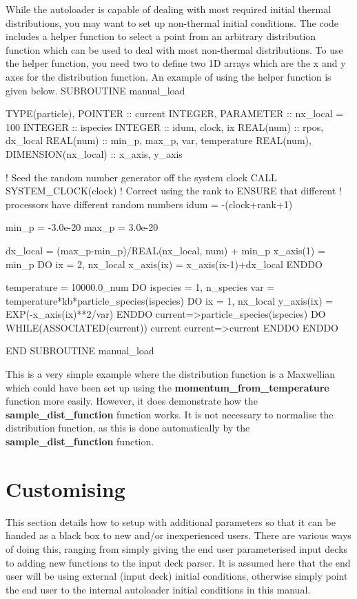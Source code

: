 \documentclass[12pt,a4paper]{article}
\newcommand{\EPOCH}{{\color{warwickdark}\fontfamily{phv}\selectfont{EPOCH}}}
\newenvironment{boxverbatim}{\lboxverbatim{none}}{\endlboxverbatim}
\begin{document}
While the autoloader is capable of dealing with most required initial thermal
distributions, you may want to set up non-thermal initial conditions. The code
includes a helper function to select a point from an arbitrary distribution
function which can be used to deal with most non-thermal distributions. To use
the helper function, you need two to define two 1D arrays which are the x and
y axes for the distribution function. An example of using the helper function
is given below.
\begin{boxverbatim}
SUBROUTINE manual_load

  TYPE(particle), POINTER :: current
  INTEGER, PARAMETER :: nx_local = 100
  INTEGER :: ispecies
  INTEGER :: idum, clock, ix
  REAL(num) :: rpos, dx_local
  REAL(num) :: min_p, max_p, var, temperature
  REAL(num), DIMENSION(nx_local) :: x_axis, y_axis

  ! Seed the random number generator off the system clock
  CALL SYSTEM_CLOCK(clock)
  ! Correct using the rank to ENSURE that different
  ! processors have different random numbers
  idum = -(clock+rank+1)

  min_p = -3.0e-20
  max_p = 3.0e-20

  dx_local = (max_p-min_p)/REAL(nx_local, num) + min_p
  x_axis(1) = min_p
  DO ix = 2, nx_local
    x_axis(ix) = x_axis(ix-1)+dx_local
  ENDDO

  temperature = 10000.0_num
  DO ispecies = 1, n_species
    var = temperature*kb*particle_species(ispecies)%
    DO ix = 1, nx_local
      y_axis(ix) = EXP(-x_axis(ix)**2/var)
    ENDDO
    current=>particle_species(ispecies)%
    DO WHILE(ASSOCIATED(current))
      current%
      current=>current%
    ENDDO
  ENDDO

END SUBROUTINE manual_load
\end{boxverbatim}

This is a very simple example where the distribution function is a Maxwellian
which could have been set up using the {\bf momentum\_from\_temperature}
function more easily. However, it does demonstrate how the
{\bf sample\_dist\_function} function works. It is not necessary to normalise
the distribution function, as this is done automatically by the
{\bf sample\_dist\_function} function.

\section{Customising {\EPOCH}}
This section details how to setup {\EPOCH} with additional parameters so that
it can be handed as a black box to new and/or inexperienced users. There are
various ways of doing this, ranging from simply giving the end user
parameterised input decks to adding new functions to the input deck parser. It
is assumed here that the end user will be using external (input deck) initial
conditions, otherwise simply point the end user to the internal autoloader
initial conditions in this manual.
\end{document}
